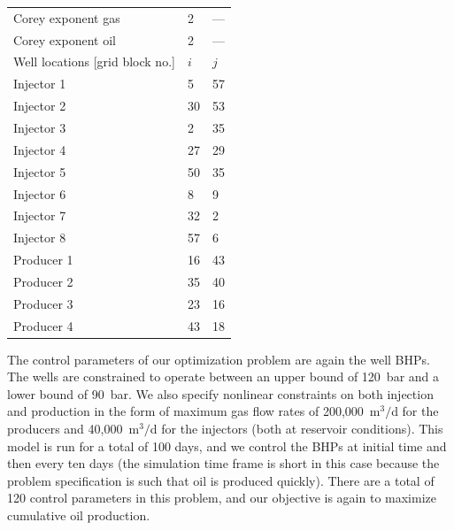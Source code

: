 \begin{table}
\begin{tabular*}{84mm}{@{\extracolsep\fill}lll}
Corey exponent gas       & 2 & ---                           \\
Corey exponent oil       & 2 & ---                           \\[2pt]
\bottomrule
Well locations [grid block no.] & $i$ & $j$                  \\
\midrule
Injector 1               &  5 &  57                          \\
Injector 2               &  30&  53                          \\
Injector 3               &   2&  35                          \\
Injector 4               &  27&  29                          \\
Injector 5               &  50&  35                          \\
Injector 6               &   8&   9                          \\
Injector 7               &  32&   2                          \\
Injector 8               &  57&   6                          \\
Producer 1               &  16&  43                          \\
Producer 2               &  35&  40                          \\
Producer 3               &  23&  16                          \\
Producer 4               &  43&  18                          \\[2pt]
\bottomrule
\end{tabular*}
\end{table}





The control parameters of our optimization problem are again the well BHPs.  The
wells are constrained to operate between an upper bound of 120~bar and a lower
bound of 90~bar. We also specify nonlinear constraints on both injection and
production in the form of maximum gas flow
rates of 200,000~m$^3/$d for the producers and 40,000~m$^3/$d for the injectors
(both at reservoir conditions). This model is run for a total of 100 days, and
we control the BHPs at initial time and then every ten days (the simulation time
frame is short in this case because the problem specification is such that oil
is produced quickly). There are a total of 120 control parameters in this
problem, and our objective is again to maximize cumulative oil production.

